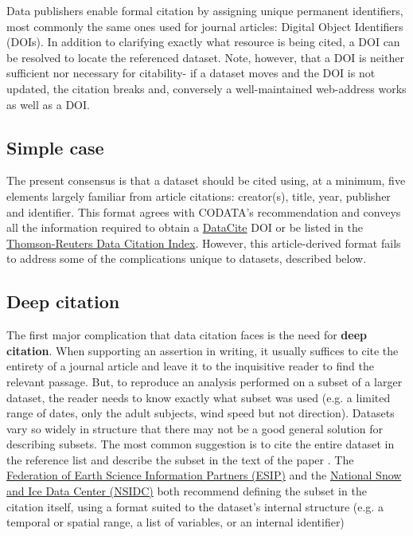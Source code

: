 \documentclass[10pt,a4paper,twocolumn]{article}
\begin{document}
{Data publishers enable formal citation by assigning unique permanent identifiers, most commonly the same ones used for journal articles: Digital Object Identifiers (DOIs).
In addition to clarifying exactly what resource is being cited, a DOI can be resolved to locate the referenced dataset.
Note, however, that a DOI is neither sufficient nor necessary for citability- if a dataset moves and the DOI is not updated, the citation breaks and, conversely a well-maintained web-address works as well as a DOI.

\subsection*{Simple case}\label{simple-case}

The present consensus is that a dataset should be cited using, at a minimum, five elements largely familiar from article citations: creator(s), title, year, publisher and identifier.
This format agrees with CODATA's recommendation\cite{codata-icsti_task_group_on_data_citation_standards_and_practices_out_2013} and conveys all the information required to obtain a \href{http://www.datacite.org/}{DataCite} DOI\cite{starr_iscitedby:_2011} or be listed in the \href{http://thomsonreuters.com/data-citation-index/}{Thomson-Reuters Data Citation Index}.
However, this article-derived format fails to address some of the complications unique to datasets, described below.

\subsection*{Deep citation}\label{deep-citation}

The first major complication that data citation faces is the need for \textbf{deep citation}.
When supporting an assertion in writing, it usually suffices to cite the entirety of a journal article and leave it to the inquisitive reader to find the relevant passage.
But, to reproduce an analysis performed on a subset of a larger dataset, the reader needs to know exactly what subset was used (e.g. a limited range of dates, only the adult subjects, wind speed but not direction).
Datasets vary so widely in structure that there may not be a good general solution for describing subsets.
The most common suggestion is to cite the entire dataset in the reference list and describe the subset in the text of the paper \cite{altman_proposed_2007}.
The \href{http://wiki.esipfed.org/index.php/Interagency_Data_Stewardship/Citations/provider_guidelines#Subset_Used}{Federation of Earth Science Information Partners (ESIP)} and the \href{http://nsidc.org/about/use_copyright.html}{National Snow and Ice Data Center (NSIDC)} both recommend defining the subset in the citation itself, using a format suited to the dataset's internal structure (e.g. a temporal or spatial range, a list of variables, or an internal identifier)

}
\end{document}
